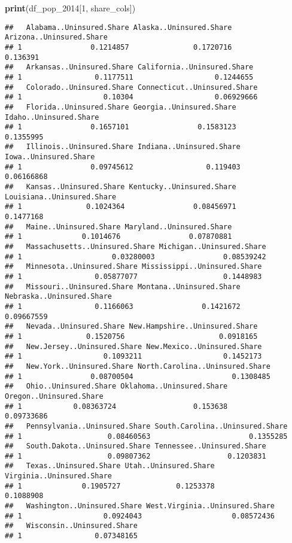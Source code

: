 \documentclass[
]{article}
\newenvironment{Shaded}{\begin{snugshade}}{\end{snugshade}}
\newcommand{\DecValTok}[1]{\textcolor[rgb]{0.00,0.00,0.81}{#1}}
\newcommand{\FunctionTok}[1]{\textcolor[rgb]{0.13,0.29,0.53}{\textbf{#1}}}
\newcommand{\NormalTok}[1]{#1}
\begin{document}
\begin{Shaded}
\begin{Highlighting}[]
\FunctionTok{print}\NormalTok{(df\_pop\_2014[}\DecValTok{1}\NormalTok{, share\_cols])}
\end{Highlighting}
\end{Shaded}

\begin{verbatim}
##   Alabama..Uninsured.Share Alaska..Uninsured.Share Arizona..Uninsured.Share
## 1                0.1214857               0.1720716                 0.136391
##   Arkansas..Uninsured.Share California..Uninsured.Share
## 1                 0.1177511                   0.1244655
##   Colorado..Uninsured.Share Connecticut..Uninsured.Share
## 1                   0.10304                   0.06929666
##   Florida..Uninsured.Share Georgia..Uninsured.Share Idaho..Uninsured.Share
## 1                0.1657101                0.1583123              0.1355995
##   Illinois..Uninsured.Share Indiana..Uninsured.Share Iowa..Uninsured.Share
## 1                0.09745612                 0.119403            0.06166868
##   Kansas..Uninsured.Share Kentucky..Uninsured.Share Louisiana..Uninsured.Share
## 1               0.1024364                0.08456971                  0.1477168
##   Maine..Uninsured.Share Maryland..Uninsured.Share
## 1              0.1014676                0.07870881
##   Massachusetts..Uninsured.Share Michigan..Uninsured.Share
## 1                     0.03280003                0.08539242
##   Minnesota..Uninsured.Share Mississippi..Uninsured.Share
## 1                 0.05877077                    0.1448983
##   Missouri..Uninsured.Share Montana..Uninsured.Share Nebraska..Uninsured.Share
## 1                 0.1166063                0.1421672                0.09667559
##   Nevada..Uninsured.Share New.Hampshire..Uninsured.Share
## 1               0.1520756                      0.0918165
##   New.Jersey..Uninsured.Share New.Mexico..Uninsured.Share
## 1                   0.1093211                   0.1452173
##   New.York..Uninsured.Share North.Carolina..Uninsured.Share
## 1                0.08700504                       0.1308485
##   Ohio..Uninsured.Share Oklahoma..Uninsured.Share Oregon..Uninsured.Share
## 1            0.08363724                  0.153638              0.09733686
##   Pennsylvania..Uninsured.Share South.Carolina..Uninsured.Share
## 1                    0.08460563                       0.1355285
##   South.Dakota..Uninsured.Share Tennessee..Uninsured.Share
## 1                    0.09807362                  0.1203831
##   Texas..Uninsured.Share Utah..Uninsured.Share Virginia..Uninsured.Share
## 1              0.1905727             0.1253378                 0.1088908
##   Washington..Uninsured.Share West.Virginia..Uninsured.Share
## 1                   0.0924043                     0.08572436
##   Wisconsin..Uninsured.Share
## 1                 0.07348165
\end{verbatim}
\end{document}
